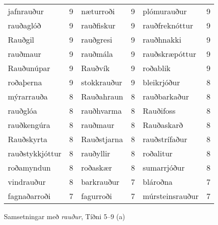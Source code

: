 \documentclass[../samsetningasafn.tex]{subfiles}
\begin{document}
		
\begin{wordlist}[H]
\begin{tcolorbox}

	\setlength{\extrarowheight}{3pt}
	\begin{tabular}{BlBlBl}
		jafnrauður		& 9		& 	
		næturroði		& 9		& 
		plómurauður		& 9		\\ 	%
		rauðaglóð		& 9		& 	
		rauðfiskur		& 9		& 	
		rauðfreknóttur	& 9		\\ 	%
		Rauðgil			& 9		& 	
		rauðgresi		& 9		& 	
		rauðhnakki		& 9		\\ 	%
		rauðmaur		& 9		& 	
		rauðmála		& 9		& 	
		rauðskræpóttur	& 9		\\ 	%
		Rauðunúpar		& 9		& 	
		Rauðvík			& 9		& 
		roðablik			& 9		\\  %
		roðaþerna		& 9		& 	
		stokkrauður		& 9		& 
		bleikrjóður		& 8		\\  %
		mýrarrauða		& 8		& 
		Rauðahraun		& 8		& 
		rauðbarkaður		& 8		\\  %
		rauðglóa			& 8		& 
		rauðhvarma		& 8		& 	
		Rauðifoss		& 8		\\ 	%
		rauðkengúra		& 8		& 	
		rauðmaur		& 8		& 	
		Rauðaskarð		& 8		\\ 	 %
		Rauðskyrta		& 8		& 	
		Rauðstjarna		& 8		& 	
		rauðstrífaður		& 8		\\ 	%
		rauðstykkjóttur	& 8		& 	
		rauðyllir			& 8		& 	
		roðalitur			& 8		\\ 	%
		roðamyndun		& 8		& 	
		roðaskær		& 8		& 	
		sumarrjóður		& 8		\\  %
		vindrauður		& 8		& 	
		barkrauður		& 7		& 	
		blároðna			& 7		\\ 	%
		fagnaðarroði		& 7		& 	
		fagurroði		& 7		& 	
		múrsteinsrauður	& 7		 	%
	\end{tabular}

\end{tcolorbox}
	\caption{Samsetningar með \textit{rauður}, Tíðni 5--9 (a)}
	\label{listi:rautt.5a}
\end{wordlist}	
\end{document}
